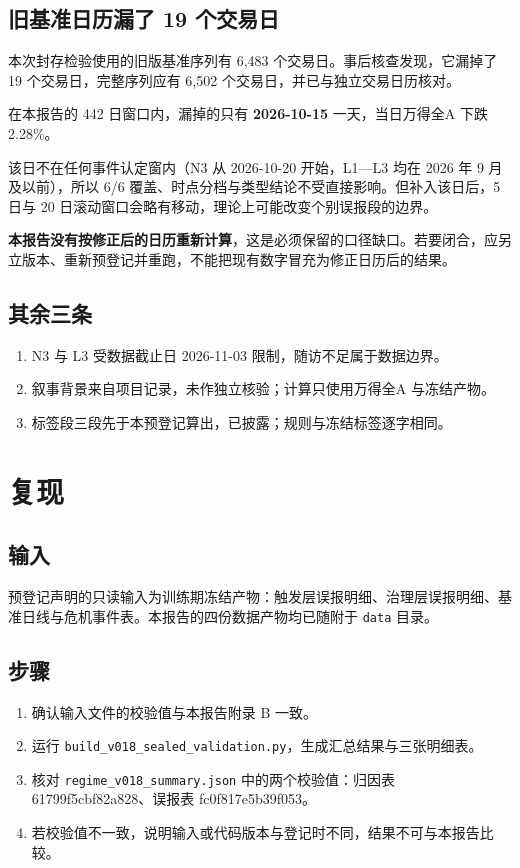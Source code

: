 \documentclass[12pt,a4paper]{ctexart}
\begin{document}
\subsection{旧基准日历漏了 19 个交易日}

本次封存检验使用的旧版基准序列有 6,483 个交易日。事后核查发现，它漏掉了 19 个交易日，完整序列应有 6,502 个交易日，并已与独立交易日历核对。

在本报告的 442 日窗口内，漏掉的只有 \textbf{2026-10-15} 一天，当日万得全A 下跌 2.28\%。

该日不在任何事件认定窗内（N3 从 2026-10-20 开始，L1—L3 均在 2026 年 9 月及以前），所以 6/6 覆盖、时点分档与类型结论不受直接影响。但补入该日后，5 日与 20 日滚动窗口会略有移动，理论上可能改变个别误报段的边界。

\textbf{本报告没有按修正后的日历重新计算}，这是必须保留的口径缺口。若要闭合，应另立版本、重新预登记并重跑，不能把现有数字冒充为修正日历后的结果。

\subsection{其余三条}

\begin{enumerate}[leftmargin=2em,itemsep=2pt]
\item N3 与 L3 受数据截止日 2026-11-03 限制，随访不足属于数据边界。
\item 叙事背景来自项目记录，未作独立核验；计算只使用万得全A 与冻结产物。
\item 标签段三段先于本预登记算出，已披露；规则与冻结标签逐字相同。
\end{enumerate}

\section{复现}

\subsection{输入}

预登记声明的只读输入为训练期冻结产物：触发层误报明细、治理层误报明细、基准日线与危机事件表。本报告的四份数据产物均已随附于 \texttt{data} 目录。

\subsection{步骤}

\begin{enumerate}[leftmargin=2em,itemsep=2pt]
\item 确认输入文件的校验值与本报告附录 B 一致。
\item 运行 \texttt{build\_v018\_sealed\_validation.py}，生成汇总结果与三张明细表。
\item 核对 \texttt{regime\_v018\_summary.json} 中的两个校验值：归因表 61799f5cbf82a828、误报表 fc0f817e5b39f053。
\item 若校验值不一致，说明输入或代码版本与登记时不同，结果不可与本报告比较。
\end{enumerate}
\end{document}
